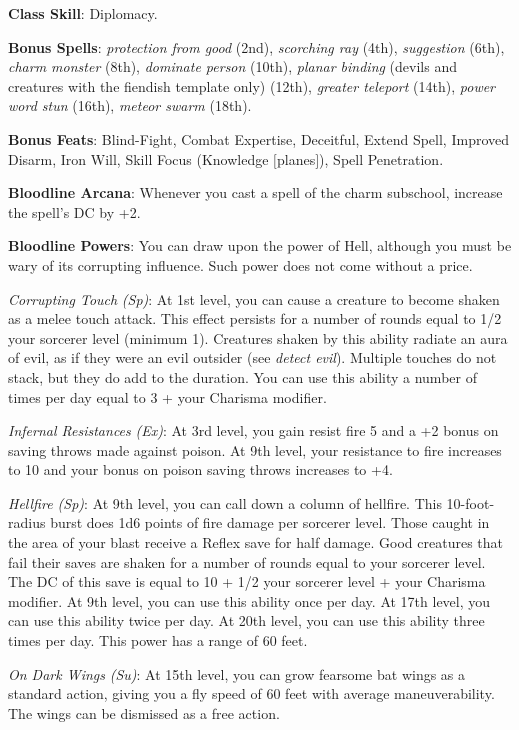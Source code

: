 \textbf{Class Skill}: Diplomacy.
				
\textbf{Bonus Spells}: \textit{protection from good} (2nd), \textit{scorching ray} (4th), \textit{suggestion} (6th),
\textit{charm monster} (8th), \textit{dominate person }(10th),
\textit{planar binding} (devils and creatures with the fiendish template only) (12th), \textit{greater teleport} (14th),
\textit{power word stun} (16th), \textit{meteor swarm} (18th).
				
\textbf{Bonus Feats}: Blind-Fight, Combat Expertise, Deceitful, Extend Spell, Improved Disarm, Iron Will,
Skill Focus (Knowledge \mbox{$[$}planes\mbox{$]$}), Spell Penetration.
				
\textbf{Bloodline Arcana}: Whenever you cast a spell of the charm subschool, increase the spell's DC by +2.
				
\textbf{Bloodline Powers}: You can draw upon the power of Hell, although you must be wary of its corrupting influence. Such power
does not come without a price.
				
\textit{Corrupting Touch} \textit{(Sp)}: At 1st level, you can cause a creature to become shaken as a melee touch attack. This
effect persists for a number of rounds equal to 1/2 your sorcerer level (minimum 1). Creatures shaken by this ability radiate an
aura of evil, as if they were an evil outsider (see \textit{detect evil}). Multiple touches do not stack, but they do add to the
duration. You can use this ability a number of times per day equal to 3 + your Charisma modifier.
				
\textit{Infernal Resistances} \textit{(Ex)}: At 3rd level, you gain resist fire 5 and a +2 bonus on saving throws made against
poison. At 9th level, your resistance to fire increases to 10 and your bonus on poison saving throws increases to +4.
				
\textit{Hellfire (Sp)}: At 9th level, you can call down a column of hellfire. This 10-foot-radius burst does 1d6 points of fire
damage per sorcerer level. Those caught in the area of your blast receive a Reflex save for half damage. Good creatures that fail
their saves are shaken for a number of rounds equal to your sorcerer level. The DC of this save is equal to 10 + 1/2 your sorcerer
level + your Charisma modifier. At 9th level, you can use this ability once per day. At 17th level, you can use this ability twice
per day. At 20th level, you can use this ability three times per day. This power has a range of 60 feet.
				
\textit{On Dark Wings} \textit{(Su)}: At 15th level, you can grow fearsome bat wings as a standard action, giving you a fly speed
of 60 feet with average maneuverability. The wings can be dismissed as a free action.
				
